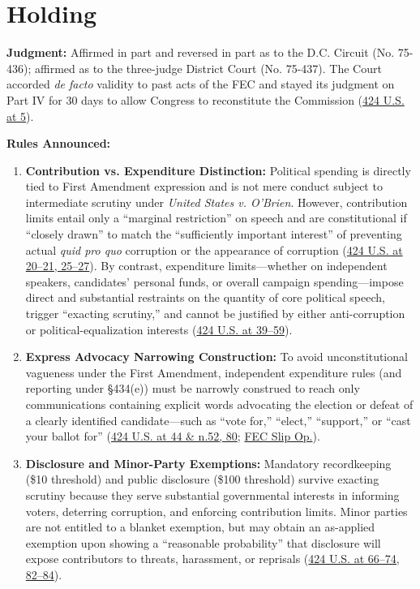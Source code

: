 \documentclass[12pt]{article}
\begin{document}
\section{Holding}

\textbf{Judgment:} Affirmed in part and reversed in part as to the D.C. Circuit (No. 75-436); affirmed as to the three-judge District Court (No. 75-437). The Court accorded \textit{de facto} validity to past acts of the FEC and stayed its judgment on Part IV for 30 days to allow Congress to reconstitute the Commission (\href{https://supreme.justia.com/cases/federal/us/424/1/}{424 U.S. at 5}).

\textbf{Rules Announced:}
\begin{enumerate}
  \item \textbf{Contribution vs. Expenditure Distinction:} Political spending is directly tied to First Amendment expression and is not mere conduct subject to intermediate scrutiny under \textit{United States v. O'Brien}. However, contribution limits entail only a ``marginal restriction'' on speech and are constitutional if ``closely drawn'' to match the ``sufficiently important interest'' of preventing actual \textit{quid pro quo} corruption or the appearance of corruption (\href{https://supreme.justia.com/cases/federal/us/424/1/}{424 U.S. at 20--21, 25--27}). By contrast, expenditure limits---whether on independent speakers, candidates' personal funds, or overall campaign spending---impose direct and substantial restraints on the quantity of core political speech, trigger ``exacting scrutiny,'' and cannot be justified by either anti-corruption or political-equalization interests (\href{https://supreme.justia.com/cases/federal/us/424/1/}{424 U.S. at 39--59}).
  \item \textbf{Express Advocacy Narrowing Construction:} To avoid unconstitutional vagueness under the First Amendment, independent expenditure rules (and reporting under \S 434(e)) must be narrowly construed to reach only communications containing explicit words advocating the election or defeat of a clearly identified candidate---such as ``vote for,'' ``elect,'' ``support,'' or ``cast your ballot for'' (\href{https://supreme.justia.com/cases/federal/us/424/1/}{424 U.S. at 44 \& n.52, 80}; \href{https://www.fec.gov/resources/legal-resources/litigation/Buckley.pdf}{FEC Slip Op.}).
  \item \textbf{Disclosure and Minor-Party Exemptions:} Mandatory recordkeeping (\$10 threshold) and public disclosure (\$100 threshold) survive exacting scrutiny because they serve substantial governmental interests in informing voters, deterring corruption, and enforcing contribution limits. Minor parties are not entitled to a blanket exemption, but may obtain an as-applied exemption upon showing a ``reasonable probability'' that disclosure will expose contributors to threats, harassment, or reprisals (\href{https://supreme.justia.com/cases/federal/us/424/1/}{424 U.S. at 66--74, 82--84}).

\end{enumerate}
\end{document}
